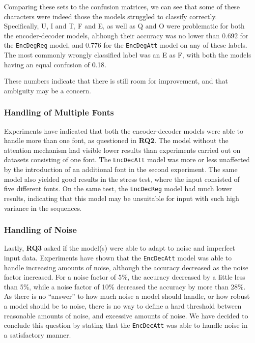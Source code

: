 Comparing these sets to the confusion matrices, we can see that some of these characters were indeed those the models struggled to classify correctly. Specifically, U, I and T, F and E, as well as Q and O were problematic for both the encoder-decoder models, although their accuracy was no lower than 0.692 for the {\tt EncDegReg} model, and 0.776 for the {\tt EncDegAtt} model on any of these labels. The most commonly wrongly classified label was an E as F, with both the models having an equal confusion of 0.18. 

These numbers indicate that there is still room for improvement, and that ambiguity may be a concern.

\subsubsection{Handling of Multiple Fonts}
Experiments have indicated that both the encoder-decoder models were able to handle more than one font, as questioned in \textbf{RQ2}. The model without the attention mechanism had visible lower results than experiments carried out on datasets consisting of one font. The {\tt EncDecAtt} model was more or less unaffected by the introduction of an additional font in the second experiment. The same model also yielded good results in the stress test, where the input consisted of five different fonts. On the same test, the {\tt EncDecReg} model had much lower results, indicating that this model may be unsuitable for input with such high variance in the sequences.

\subsubsection{Handling of Noise}
Lastly, \textbf{RQ3} asked if the model(s) were able to adapt to noise and imperfect input data. Experiments have shown that the {\tt EncDecAtt} model was able to handle increasing amounts of noise, although the accuracy decreased as the noise factor increased. For a noise factor of 5\%, the accuracy decreased by a little less than 5\%, while a noise factor of 10\% decreased the accuracy by more than 28\%. As there is no ``answer'' to how much noise a model should handle, or how robust a model should be to noise, there is no way to define a hard threshold between reasonable amounts of noise, and excessive amounts of noise. We have decided to conclude this question by stating that the {\tt EncDecAtt} was able to handle noise in a satisfactory manner. 

